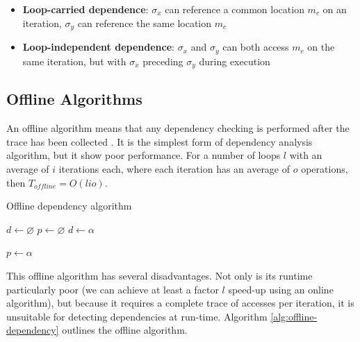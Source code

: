 	\begin{itemize}
		\item \textbf{Loop-carried dependence}: $\sigma_x$ can reference a common location $m_c$ on an iteration, $\sigma_y$ can reference the same location $m_c$
		\item \textbf{Loop-independent dependence}: $\sigma_x$ and $\sigma_y$ can both access $m_c$ on the same iteration, but with $\sigma_x$ preceding $\sigma_y$ during execution
	\end{itemize}

	\subsection{Offline Algorithms} \label{sec:runtime/analysis/offline}
	An offline algorithm means that any dependency checking is performed after the trace has been collected \citep[p.~525-526]{TAOCPvol2}. It is the simplest form of dependency analysis algorithm, but it show poor performance. For a number of loops $l$ with an average of $i$ iterations each, where each iteration has an average of $o$ operations, then $T_{offline}=O(lio)$.
	
	\begin{algorithm}
		\caption{Offline dependency algorithm}
		\label{alg:offline-dependency}
		\begin{algorithmic}[1]
			\STATE $d \gets \varnothing$ 
				\STATE $p \gets \varnothing$ 
								\STATE $d \gets \alpha$
							\ENDIF
							
							\STATE $p \gets \alpha$
						\ENDFOR
					\ENDFOR
				\ENDFOR
			\ENDFOR
		\end{algorithmic}
	\end{algorithm}
	
	This offline algorithm has several disadvantages. Not only is its runtime particularly poor (we can achieve at least a factor $l$ speed-up using an online algorithm), but because it requires a complete trace of accesses per iteration, it is unsuitable for  detecting dependencies at run-time. Algorithm \ref{alg:offline-dependency} outlines the offline algorithm.

